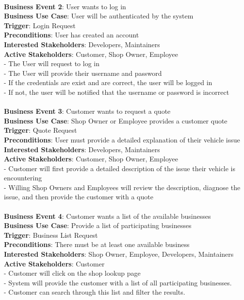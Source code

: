 \documentclass[12pt]{article}
\begin{document}
\\ \textbf{Business Event 2}: User wants to log in
\\ \textbf{Business Use Case}: User will be authenticated by the system
\\ \textbf{Trigger}: Login Request
\\ \textbf{Preconditions}: User has created an account
\\ \textbf{Interested Stakeholders}: Developers, Maintainers
\\ \textbf{Active Stakeholders}: Customer, Shop Owner, Employee
\\ - The User will request to log in
\\ - The User will provide their username and password
\\ - If the credentials are exist and are correct, the user will be logged in
\\ - If not, the user will be notified that the username or password is incorrect
\\

\\ \textbf{Business Event 3}: Customer wants to request a quote
\\ \textbf{Business Use Case}: Shop Owner or Employee provides a customer quote
\\ \textbf{Trigger}: Quote Request
\\ \textbf{Preconditions}: User must provide a detailed  explanation of their vehicle issue
\\ \textbf{Interested Stakeholders}: Developers, Maintainers
\\ \textbf{Active Stakeholders}: Customer, Shop Owner, Employee
\\ - Customer will first provide a detailed description of the issue their vehicle is encountering
\\ - Willing Shop Owners and Employees will review the description, diagnose the issue, and then provide the customer with a quote
\\

\\ \textbf{Business Event 4}: Customer wants a list of the available businesses
\\ \textbf{Business Use Case}: Provide a list of participating businesses 
\\ \textbf{Trigger}: Business List Request
\\ \textbf{Preconditions}: There must be at least one available business
\\ \textbf{Interested Stakeholders}: Shop Owner, Employee, Developers, Maintainers
\\ \textbf{Active Stakeholders}: Customer
\\ - Customer will click on the shop lookup page
\\ - System will provide the customer with a list of all participating businesses.
\\ - Customer can search through this list and filter the results.
\\
\end{document}
